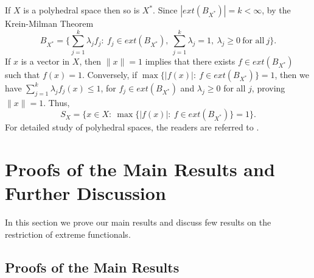 \documentclass{amsart}
\theoremstyle{definition}
\theoremstyle{remark}
\numberwithin{equation}{section}
\begin{document}
\medskip


\noindent If $X$ is a polyhedral space then so is $X^*$. Since $|ext(B_{X^*})|=k<\infty$, by the Krein-Milman Theorem 
\[
B_{X^*}=\{\sum_{j=1}^k \lambda_jf_j:~f_j\in ext(B_{X^*}),~\sum_{j=1}^k\lambda_j=1, ~\lambda_j\geq 0~\text{for all}~j\}.
\] 
If $x$ is a vector in $X$, then $\|x\|=1$ implies that there exists $f\in ext(B_{X^*})$ such that $f(x)=1$. Conversely, if $\max\{|f(x)|:~f\in ext(B_{X^*})\}=1$, then we have $\sum_{j=1}^k \lambda_jf_j(x)\leq 1$, for $f_j\in ext(B_{X^*})$ and $\lambda_j\geq 0$ for all $j$, proving $\|x\|=1$. Thus,  
\begin{equation}\label{unit sphere}
S_X = \{x\in X:~\max\{|f(x)|:~f\in ext(B_{X^*})\}=1\}.
\end{equation}
\noindent For detailed study of polyhedral spaces, the readers are referred to \cite{FHHSPZ01, GM72, SPBB19, R70}.


\section{Proofs of the Main Results and Further Discussion}

\noindent In this section we prove our main results and discuss few results on the restriction of extreme functionals.

\subsection{Proofs of the Main Results}
\end{document}
